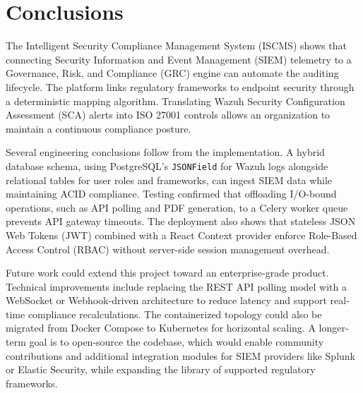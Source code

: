\chapter{Conclusions}

The Intelligent Security Compliance Management System (ISCMS) shows that connecting Security Information and Event Management (SIEM) telemetry to a Governance, Risk, and Compliance (GRC) engine can automate the auditing lifecycle. The platform links regulatory frameworks to endpoint security through a deterministic mapping algorithm. Translating Wazuh Security Configuration Assessment (SCA) alerts into ISO 27001 controls allows an organization to maintain a continuous compliance posture.

Several engineering conclusions follow from the implementation. A hybrid database schema, using PostgreSQL's \texttt{JSONField} for Wazuh logs alongside relational tables for user roles and frameworks, can ingest SIEM data while maintaining ACID compliance. Testing confirmed that offloading I/O-bound operations, such as API polling and PDF generation, to a Celery worker queue prevents API gateway timeouts. The deployment also shows that stateless JSON Web Tokens (JWT) combined with a React Context provider enforce Role-Based Access Control (RBAC) without server-side session management overhead.

Future work could extend this project toward an enterprise-grade product. Technical improvements include replacing the REST API polling model with a WebSocket or Webhook-driven architecture to reduce latency and support real-time compliance recalculations. The containerized topology could also be migrated from Docker Compose to Kubernetes for horizontal scaling. A longer-term goal is to open-source the codebase, which would enable community contributions and additional integration modules for SIEM providers like Splunk or Elastic Security, while expanding the library of supported regulatory frameworks.
